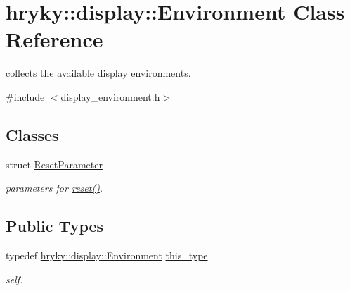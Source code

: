 \hypertarget{classhryky_1_1display_1_1_environment}{\section{hryky\-:\-:display\-:\-:Environment Class Reference}
\label{classhryky_1_1display_1_1_environment}
}


collects the available display environments.  




{\ttfamily \#include $<$display\-\_\-environment.\-h$>$}

\subsection*{Classes}
\begin{DoxyCompactItemize}
\item 
struct \hyperlink{structhryky_1_1display_1_1_environment_1_1_reset_parameter}{Reset\-Parameter}
\begin{DoxyCompactList}\small\item\em parameters for \hyperlink{classhryky_1_1display_1_1_environment_ae9bf389c9271424c89a536ce16945b8f}{reset()}. \end{DoxyCompactList}\end{DoxyCompactItemize}
\subsection*{Public Types}
\begin{DoxyCompactItemize}
\item 
\hypertarget{classhryky_1_1display_1_1_environment_a6318fe148797bbe0f7ca7417f3c391bd}{typedef \hyperlink{classhryky_1_1display_1_1_environment}{hryky\-::display\-::\-Environment} \hyperlink{classhryky_1_1display_1_1_environment_a6318fe148797bbe0f7ca7417f3c391bd}{this\-\_\-type}}\label{classhryky_1_1display_1_1_environment_a6318fe148797bbe0f7ca7417f3c391bd}

\begin{DoxyCompactList}\small\item\em self. \end{DoxyCompactList}\end{DoxyCompactItemize}
